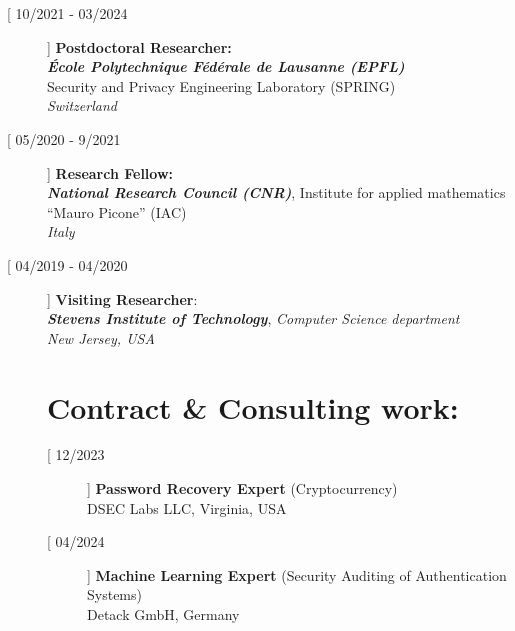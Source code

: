 \documentclass[margin, 10pt]{article} %
\begin{document}
\begin{description}
\item[[ {10/2021 - 03/2024}]] \textbf{Postdoctoral Researcher:}\\
 \textbf{\textit{École Polytechnique Fédérale de Lausanne (EPFL)}}\\ 
Security and Privacy Engineering Laboratory (SPRING)\\
\textit{Switzerland}
\item[[ 05/2020 - 9/2021]] \textbf{Research Fellow:}\\
 \textbf{\textit{National Research Council (CNR)}}, 
Institute for applied mathematics ``Mauro Picone'' (IAC)\\
\textit{Italy}
\item[[ 04/2019 - 04/2020]] \textbf{Visiting Researcher}:\\
 \textbf{\textit{Stevens Institute of Technology}}, \textit{Computer Science department}\\ 
\textit{New Jersey, USA}
	
\section*{\normalsize{Contract \& Consulting work:}}
\vspace{-.35cm}
\begin{description}
	\item[[ 12/2023]] \textbf{Password Recovery Expert} (Cryptocurrency)\\
	 DSEC Labs LLC, Virginia, USA
	 \item[[ 04/2024]] \textbf{Machine Learning Expert} (Security Auditing of Authentication Systems)\\
	Detack GmbH, Germany\\
	
\end{description}
\end{description}
\noindent\makebox[\linewidth]{\rule{.2\paperwidth}{0.3pt}}
\end{document}
